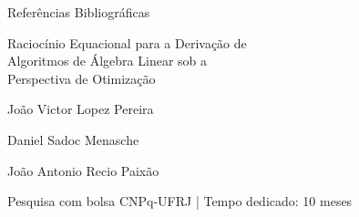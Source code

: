 
\begin{frame}{Referências Bibliográficas}
  \nocite{*}
  \printbibliography[heading=none]
\end{frame}


\begin{frame}[plain]
  \centering
  \vspace{1cm}
  {\LARGE Raciocínio Equacional para a Derivação de \\ Algoritmos de Álgebra Linear sob a \\ Perspectiva de Otimização \par}
  \vspace{1cm}
  {\large João Victor Lopez Pereira \par}
  \vspace{0.5cm}
  {\large Daniel Sadoc Menasche \par}
  \vspace{0.5cm}
  {\large João Antonio Recio Paixão \par}
  \vfill
  {\footnotesize Pesquisa com bolsa CNPq-UFRJ \quad | \quad Tempo dedicado: 10 meses \par}
  \vfill
\end{frame}
